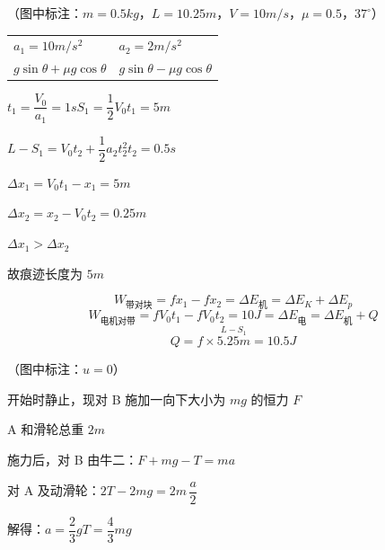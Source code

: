 \begin{problem}
（图中标注：$m=0.5\unit{kg}$，$L=10.25\unit{m}$，$V=10\unit{m/s}$，$\mu=0.5$，$37^\circ$）
\begin{solution}
\begin{tabular}{@{}ll@{}}
$a_1=10\unit{m/s^2}$ & $a_2=2\unit{m/s^2}$\\
$g\sin\theta+\mu g\cos\theta$ & $g\sin\theta-\mu g\cos\theta$
\end{tabular}

$t_1=\dfrac{V_0}{a_1}=1\unit{s}$\qquad $S_1=\dfrac12V_0t_1=5\unit{m}$

$L-S_1=V_0t_2+\dfrac12a_2t_2^2$\qquad $t_2=0.5\unit{s}$

$\Delta x_1=V_0t_1-x_1=5\unit{m}$ %

$\Delta x_2=x_2-V_0t_2=0.25\unit{m}$

$\Delta x_1>\Delta x_2$

故痕迹长度为 $5\unit{m}$

\[ W_{\text{带对块}}=fx_1-fx_2=\Delta E_{\text{机}}=\Delta E_K+\Delta E_p \]
\[ W_{\text{电机对带}}=fV_0t_1-fV_0t_2=10\unit{J}=\Delta E_{\text{电}}=\Delta E_{\text{机}}+Q \]
\[ Q=f\times\overset{L-S_1}{5.25\unit{m}}=10.5\unit{J} \]
\end{solution}
\end{problem}
\begin{problem}
（图中标注：$u=0$） %

开始时静止，现对 B 施加一向下大小为 $mg$ 的恒力 $F$

A 和滑轮总重 $2m$
\begin{solution}
施力后，对 B 由牛二：$F+mg-T=ma$

对 A 及动滑轮：$2T-2mg=2m\,\dfrac{a}{2}$

解得：$a=\dfrac23g$\qquad $T=\dfrac43mg$
\end{solution}
\end{problem}
